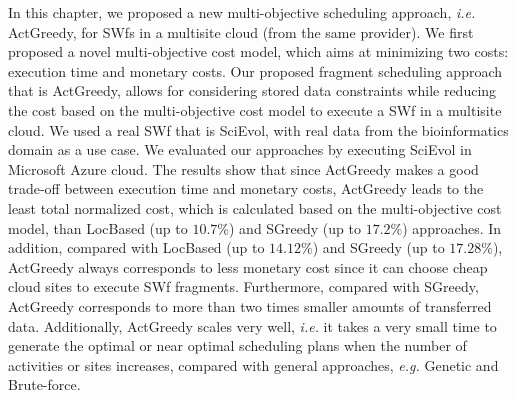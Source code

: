 In this chapter, we proposed a new multi-objective scheduling approach, \textit{i.e.} ActGreedy, for SWfs in a multisite cloud (from the same provider). We first proposed a novel multi-objective cost model, which aims at minimizing two costs: execution time and monetary costs.
Our proposed fragment scheduling approach that is ActGreedy, allows for considering stored data constraints while reducing the cost based on the multi-objective cost model to execute a SWf in a multisite cloud. 
We used a real SWf that is SciEvol, with real data from the bioinformatics domain as a use case. We evaluated our approaches by executing SciEvol in Microsoft Azure cloud. The results show that since ActGreedy makes a good trade-off between execution time and monetary costs, ActGreedy leads to the least total normalized cost, which is calculated based on the multi-objective cost model, than LocBased (up to $10.7\%$) and SGreedy (up to $17.2\%$) approaches. 
In addition, compared with LocBased (up to $14.12\%$) and SGreedy (up to $17.28\%$), ActGreedy always corresponds to less monetary cost since it can choose cheap cloud sites to execute SWf fragments.
Furthermore, compared with SGreedy, ActGreedy corresponds to more than two times smaller amounts of transferred data. 
Additionally, ActGreedy scales very well, \textit{i.e.} it takes a very small time to generate the optimal or near optimal scheduling plans when the number of activities or sites increases, compared with general approaches, \textit{e.g.} Genetic and Brute-force.